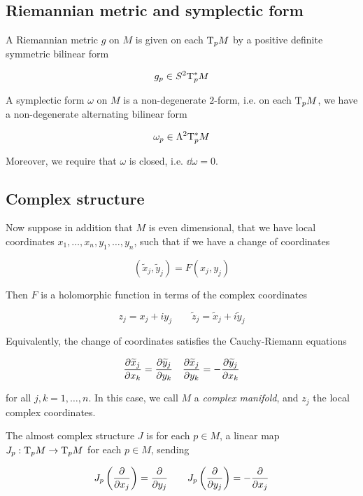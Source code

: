 \documentclass{report}
\renewcommand{\tilde}{\widetilde}
\begin{document}
\subsection{Riemannian metric and symplectic form}

\begin{definition}
     A Riemannian metric \(g\) on \(M\) is given on each \(\mathrm{T}_pM\) by a positive definite symmetric bilinear form

    \[g_p \in S^2 \mathrm{T}_p^*M\]
\end{definition}

\begin{definition}
     A symplectic form \(\omega\) on \(M\) is a non-degenerate \(2\)-form, i.e. on each \(\mathrm{T}_pM\), we have a non-degenerate alternating bilinear form

    \[\omega_p \in \Lambda^2 \mathrm{T}_p^*M\]

    Moreover, we require that \(\omega\) is closed, i.e. \(\dd\omega = 0\).
\end{definition}

\subsection{Complex structure}

Now suppose in addition that \(M\) is even dimensional, that we have local coordinates \(x_1, \dots, x_n, y_1, \dots, y_n\), such that if we have a change of coordinates

\[(\tilde x_j, \tilde y_j) = F(x_j, y_j)\]

Then \(F\) is a holomorphic function in terms of the complex coordinates

\[z_j = x_j + iy_j \quad\quad \tilde z_j = \tilde x_j + i\tilde y_j\]

Equivalently, the change of coordinates satisfies the Cauchy-Riemann equations

\[\pdv{\tilde x_j}{x_k} = \pdv{\tilde y_j}{y_k} \quad \pdv{\tilde x_j}{y_k} = -\pdv{\tilde y_j}{x_k}\]

for all \(j, k = 1, \dots, n\). In this case, we call \(M\) a \emph{complex manifold}, and \(z_j\) the local complex coordinates.

\begin{definition}
     The almost complex structure \(J\) is for each \(p \in M\), a linear map \(J_p : \mathrm{T}_pM \to \mathrm{T}_pM\) for each \(p \in M\), sending

    \[J_p\left(\pdv{x_j}\right) = \pdv{y_j} \qquad J_p\left(\pdv{y_j}\right) = -\pdv{x_j}\]
\end{definition}
\end{document}
